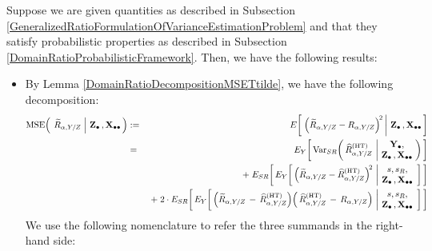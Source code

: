 \vskip 0.1cm
\noindent
Suppose we are given quantities as described in Subsection
\ref{GeneralizedRatioFormulationOfVarianceEstimationProblem}
and
that they satisfy probabilistic properties as described in Subsection
\ref{DomainRatioProbabilisticFramework}.
\vskip 0.1cm
\noindent
Then, we have the following results:
\begin{itemize}
\item
    By Lemma \ref{DomainRatioDecompositionMSETtilde}, we have the following decomposition:
    \begin{eqnarray*}
    \MSE\!\left(\;
        \left.
        \widetilde{R}_{\alpha,Y/Z}
        \;\right\vert\,
        \Zdot\,,\Xobs
        \,\right)
    & := &
        E\!\left[\,
            \left.
            \left(\widetilde{R}_{\alpha,Y/Z} - R_{\alpha,Y/Z}\right)^{\!2}
            \,\right\vert\,
            \Zdot\,,\Xobs
            \,\right]
    \\
    & = &
        E_{Y}\!\left[\,
        \Var_{SR}\!\left(\,
            \widehat{R}^{\textnormal{(HT)}}_{\alpha,Y/Z}
            \,\left\vert\!
            \begin{array}{c} \Ydot, \\ \Zdot\,,\Xobs \end{array}
            \right.
            \!\!\right)
            \,\right]
    \\
    &&
        \;+\;
        E_{SR}\!\left[\,
        E_{Y}\!\left[\,
            \left(\widetilde{R}_{\alpha,Y/Z} - \widehat{R}^{\textnormal{(HT)}}_{\alpha,Y/Z}\right)^{\!2}
            \,\left\vert\!
            \begin{array}{c} s,s_{R}, \\ \Zdot\,,\Xobs \end{array}
            \right.
            \!\right]
            \,\right]
    \\
    &&
        \;+\;
        2\cdot
        E_{SR}\!\left[\,
        E_{Y}\!\left[\,
            \left(\widetilde{R}_{\alpha,Y/Z} \,-\, \widehat{R}^{\textnormal{(HT)}}_{\alpha,Y/Z}\right)
            \!
            \left(\,\widehat{R}^{\textnormal{(HT)}}_{\alpha,Y/Z} \,-\, R_{\alpha,Y/Z}\right)
            \,\left\vert\!
            \begin{array}{c} s,s_{R}, \\ \Zdot\,,\Xobs \end{array}
            \right.
            \!\right]
            \,\right]
    \end{eqnarray*}
    We use the following nomenclature to refer the three summands in the right-hand side:

\end{itemize}
